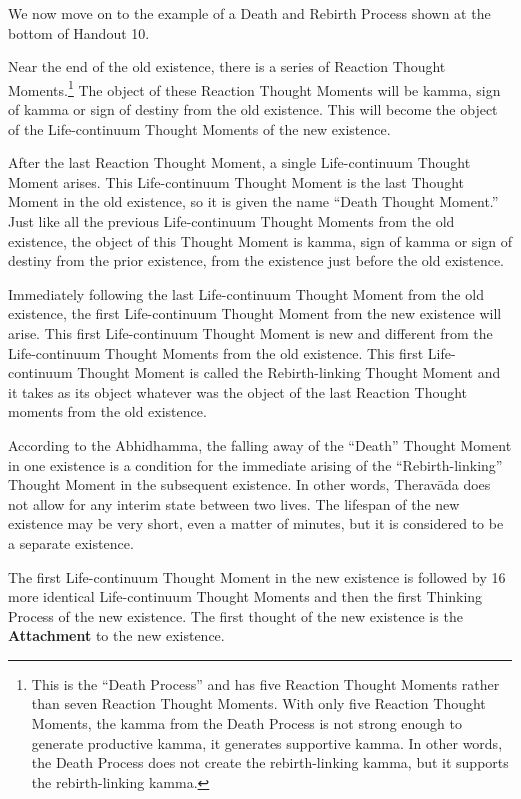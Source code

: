 We now move on to the example of a Death and Rebirth Process shown at the bottom of Handout 10. 

Near the end of the old existence, there is a series of Reaction Thought Moments.\footnote{This is the “Death Process” and has five Reaction Thought Moments rather than seven Reaction Thought Moments. With only five Reaction Thought Moments, the kamma from the Death Process is not strong enough to generate productive kamma, it generates supportive kamma. In other words, the Death Process does not create the rebirth-linking kamma, but it supports the rebirth-linking kamma.} The object of these Reaction Thought Moments will be kamma, sign of kamma or sign of destiny from the old existence. This will become the object of the Life-continuum Thought Moments of the new existence. 

After the last Reaction Thought Moment, a single Life-continuum Thought Moment arises. This Life-continuum Thought Moment is the last Thought Moment in the old existence, so it is given the name “Death Thought Moment.” Just like all the previous Life-continuum Thought Moments from the old existence, the object of this Thought Moment is kamma, sign of kamma or sign of destiny from the prior existence, from the existence just before the old existence.

Immediately following the last Life-continuum Thought Moment from the old existence, the first Life-continuum Thought Moment from the new existence will arise. This first Life-continuum Thought Moment is new and different from the Life-continuum Thought Moments from the old existence. This first Life-continuum Thought Moment is called the Rebirth-linking Thought Moment and it takes as its object whatever was the object of the last Reaction Thought moments from the old existence.

According to the Abhidhamma, the falling away of the “Death” Thought Moment in one existence is a condition for the immediate arising of the “Rebirth-linking” Thought Moment in the subsequent existence. In other words, Theravāda does not allow for any interim state between two lives. The lifespan of the new existence may be very short, even a matter of minutes, but it is considered to be a separate existence.

The first Life-continuum Thought Moment in the new existence is followed by 16 more identical Life-continuum Thought Moments and then the first Thinking Process of the new existence. The first thought of the new existence is the \textbf{Attachment} to the new existence.

